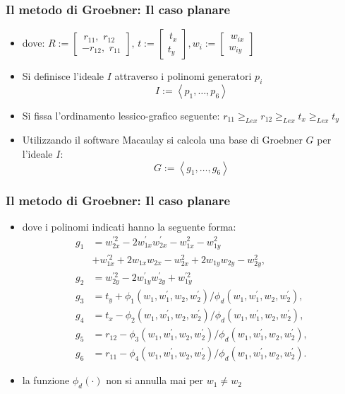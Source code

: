 \documentclass{beamer}
\begin{document}
\begin{frame}
\frametitle{Il metodo di Groebner: Il caso planare}
\begin{itemize}
	\item dove: $
	R := \begin{bmatrix}
	\,r_{11}, \,\, r_{12} \\
	-r_{12}, \,\, r_{11}
	\end{bmatrix}, \, t := \begin{bmatrix}	\,t_x \\ t_y\end{bmatrix}, w_i := \begin{bmatrix}	\,w_{ix} \\ w_{iy}\end{bmatrix}
	$
	\item Si definisce l'ideale $I$ attraverso i polinomi generatori $p_i$
	\begin{equation}
		I := \left\langle p_1, \dots, p_{6}\right\rangle
	\end{equation}
	\item Si fissa l'ordinamento lessico-grafico seguente:
	$
	r_{11} \ge_{Lex} r_{12} \ge_{Lex} t_x \ge_{Lex} t_y
	$
	\item Utilizzando il software Macaulay si calcola una base di Groebner $G$ per l'ideale $I$:
	\begin{equation}
	G := \left\langle g_1, \dots, g_6\right\rangle 
	\end{equation}
\end{itemize}
\end{frame}

\begin{frame}
\frametitle{Il metodo di Groebner: Il caso planare}
\begin{itemize}
	\item dove i polinomi indicati hanno la seguente forma:
	\begin{align}
	\nonumber g_1 &= w_{2x}^{'2}-2w_{1x}^{'}w_{2x}^{'}-w_{1x}^2-w_{1y}^2 \\ \nonumber &+w_{1x}^{'2}+2w_{1x}w_{2x}-w_{2x}^2+2w_{1y}w_{2y}-w_{2y}^2,\\
	\nonumber g_2 &= w_{2y}^{'2}-2w_{1y}^{'}w_{2y}^{'}+w_{1y}^{'2}\\
	\nonumber g_3 &= t_y +\phi_1(w_1, w_1^{'}, w_2, w_2^{'})/\phi_d(w_1, w_1^{'}, w_2, w_2^{'}),\\
	\nonumber g_4 &= t_x - \phi_2(w_1, w_1^{'}, w_2, w_2^{'})/\phi_d(w_1, w_1^{'}, w_2, w_2^{'}),\\
	\nonumber g_5 &= r_{12} - \phi_3(w_1, w_1^{'}, w_2, w_2^{'})/\phi_d(w_1, w_1^{'}, w_2, w_2^{'}),\\
	\nonumber g_6 &= r_{11} - \phi_4(w_1, w_1^{'}, w_2, w_2^{'})/\phi_d(w_1, w_1^{'}, w_2, w_2^{'}).	
	\end{align}
	\item la funzione $\phi_d(\cdot)$ non si annulla mai per $w_1 \neq w_2$
\end{itemize}
\end{frame}
\end{document}
